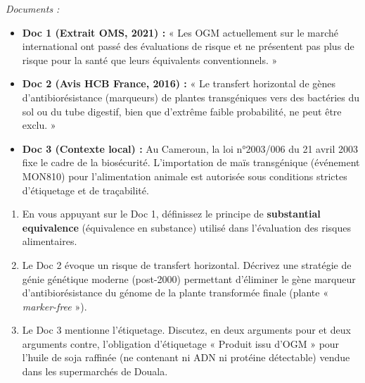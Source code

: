 \documentclass[11pt]{article}
\begin{document}
\begin{exercice}
\emph{Documents :}
\begin{itemize}
    \item \textbf{Doc 1 (Extrait OMS, 2021) :} « Les OGM actuellement sur le marché international ont passé des évaluations de risque et ne présentent pas plus de risque pour la santé que leurs équivalents conventionnels. »
    \item \textbf{Doc 2 (Avis HCB France, 2016) :} « Le transfert horizontal de gènes d'antibiorésistance (marqueurs) de plantes transgéniques vers des bactéries du sol ou du tube digestif, bien que d'extrême faible probabilité, ne peut être exclu. »
    \item \textbf{Doc 3 (Contexte local) :} Au Cameroun, la loi n°2003/006 du 21 avril 2003 fixe le cadre de la biosécurité. L'importation de maïs transgénique (événement MON810) pour l'alimentation animale est autorisée sous conditions strictes d'étiquetage et de traçabilité.
\end{itemize}

\begin{enumerate}
    \item En vous appuyant sur le Doc 1, définissez le principe de \textbf{substantial equivalence} (équivalence en substance) utilisé dans l'évaluation des risques alimentaires.
    \item Le Doc 2 évoque un risque de transfert horizontal. Décrivez une stratégie de génie génétique moderne (post-2000) permettant d'éliminer le gène marqueur d'antibiorésistance du génome de la plante transformée finale (plante « \textit{marker-free} »).
    \item Le Doc 3 mentionne l'étiquetage. Discutez, en deux arguments pour et deux arguments contre, l'obligation d'étiquetage « Produit issu d'OGM » pour l'huile de soja raffinée (ne contenant ni ADN ni protéine détectable) vendue dans les supermarchés de Douala.
\end{enumerate}
\end{exercice}
\end{document}
